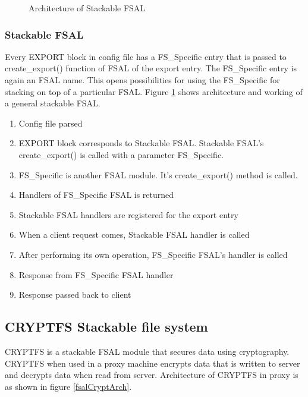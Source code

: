 \documentclass[10pt, journal, twocolumn, twoside]{IEEEtran}
\begin{document}
\begin{figure}[!btp]
  \centering
  \caption{Architecture of Stackable FSAL}
  \label{fsalStackArch}
\end{figure}

\subsubsection{Stackable FSAL}
Every EXPORT block in config file has a FS\_Specific entry that is passed to create\_export()
function of FSAL of the export entry. The FS\_Specific entry is again an FSAL name. This
opens possibilities for using the FS\_Specific for stacking on top of a particular FSAL.
Figure \ref{fsalStackArch} shows architecture and working of a  general stackable FSAL.

\begin{enumerate}
\item Config file parsed %
\item EXPORT block corresponds to Stackable FSAL. Stackable FSAL's create\_export() is called with a parameter FS\_Specific. %
\item FS\_Specific is another FSAL module. It's create\_export() method is called. %
\item Handlers of FS\_Specific FSAL is returned %
\item Stackable FSAL handlers are registered for the export entry %
\item When a client request comes, Stackable FSAL handler is called %
\item After performing its own operation, FS\_Specific FSAL's handler is called %
\item Response from FS\_Specific FSAL handler %
\item Response passed back to client %
\end{enumerate}

\begin{figure*}[!bth]
  \centering
  \caption{Architecture of CRYPTFS stacked on PROXY}
  \label{fsalCryptArch}
\end{figure*}

\subsection{CRYPTFS Stackable file system}
CRYPTFS is a stackable FSAL module that secures data using cryptography. CRYPTFS when used in a proxy machine
encrypts data that is written to server and decrypts data when read from server. Architecture of CRYPTFS in proxy
is as shown in figure \ref{fsalCryptArch}.
\end{document}
